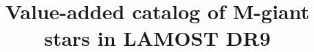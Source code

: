 \documentclass[manuscript]{aastex62}
\begin{document}
\begin{CJK*}{UTF8}{gbsn}
\title{ Value-added catalog of M-giant stars in LAMOST DR9}




\end{CJK*}
\end{document}
